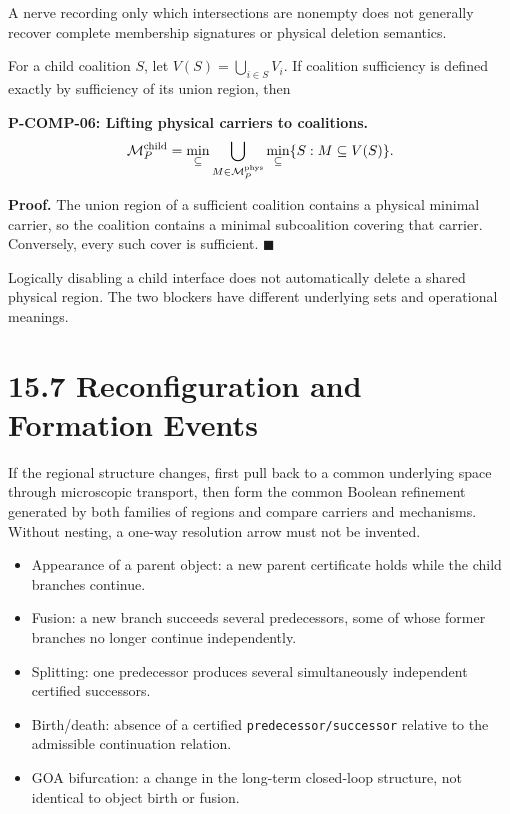 \documentclass[
  english,
  11pt,
  oneside]{book}
\newcounter{none} %
\providecommand{\tightlist}{%
  \setlength{\itemsep}{0pt}\setlength{\parskip}{0pt}}
\begin{document}
A nerve recording only which intersections are nonempty does not generally recover complete membership signatures or physical deletion semantics.

For a child coalition \(S\), let \(V(S)=\bigcup_{i\in S}V_i\). If coalition sufficiency is defined exactly by sufficiency of its union region, then

\hypertarget{p-comp-06}{}\label{p-comp-06}

\textbf{P-COMP-06: Lifting physical carriers to coalitions.} \[\mathcal M_P^{\rm child}
=\min_{\subseteq}
\bigcup_{M\in\mathcal M_P^{\rm phys}}
\min_{\subseteq}\{S:M\subseteq V(S)\}.\]

\textbf{Proof.} The union region of a sufficient coalition contains a physical minimal carrier, so the coalition contains a minimal subcoalition covering that carrier. Conversely, every such cover is sufficient. \(\blacksquare\)

Logically disabling a child interface does not automatically delete a shared physical region. The two blockers have different underlying sets and operational meanings.

\section{15.7 Reconfiguration and Formation Events}\label{reconfiguration-and-formation-events}

If the regional structure changes, first pull back to a common underlying space through microscopic transport, then form the common Boolean refinement generated by both families of regions and compare carriers and mechanisms. Without nesting, a one-way resolution arrow must not be invented.

\begin{itemize}
\tightlist
\item
  Appearance of a parent object: a new parent certificate holds while the child branches continue.
\item
  Fusion: a new branch succeeds several predecessors, some of whose former branches no longer continue independently.
\item
  Splitting: one predecessor produces several simultaneously independent certified successors.
\item
  Birth/death: absence of a certified \nolinkurl{predecessor/successor} relative to the admissible continuation relation.
\item
  GOA bifurcation: a change in the long-term closed-loop structure, not identical to object birth or fusion.
\end{itemize}
\end{document}
